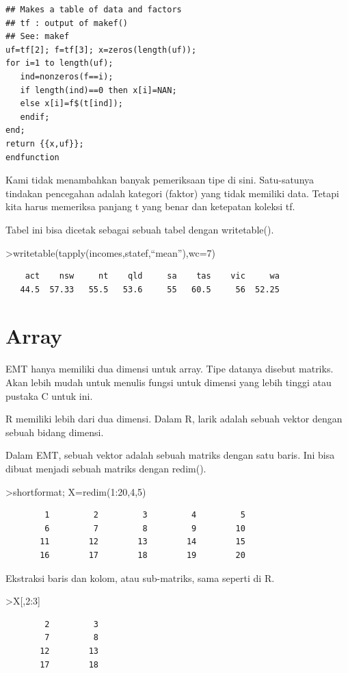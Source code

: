 \documentclass[
]{book}
\begin{document}
\begin{verbatim}
## Makes a table of data and factors
## tf : output of makef()
## See: makef
uf=tf[2]; f=tf[3]; x=zeros(length(uf));
for i=1 to length(uf);
   ind=nonzeros(f==i);
   if length(ind)==0 then x[i]=NAN;
   else x[i]=f$(t[ind]);
   endif;
end;
return {{x,uf}};
endfunction
\end{verbatim}

Kami tidak menambahkan banyak pemeriksaan tipe di sini. Satu-satunya tindakan pencegahan adalah kategori (faktor) yang tidak memiliki data. Tetapi kita harus memeriksa panjang t yang benar dan ketepatan koleksi tf.

Tabel ini bisa dicetak sebagai sebuah tabel dengan writetable().

\textgreater writetable(tapply(incomes,statef,``mean''),wc=7)

\begin{verbatim}
    act    nsw     nt    qld     sa    tas    vic     wa
   44.5  57.33   55.5   53.6     55   60.5     56  52.25
\end{verbatim}

\chapter{Array}\label{array}

EMT hanya memiliki dua dimensi untuk array. Tipe datanya disebut matriks. Akan lebih mudah untuk menulis fungsi untuk dimensi yang lebih tinggi atau pustaka C untuk ini.

R memiliki lebih dari dua dimensi. Dalam R, larik adalah sebuah vektor dengan sebuah bidang dimensi.

Dalam EMT, sebuah vektor adalah sebuah matriks dengan satu baris. Ini bisa dibuat menjadi sebuah matriks dengan redim().

\textgreater shortformat; X=redim(1:20,4,5)

\begin{verbatim}
        1         2         3         4         5 
        6         7         8         9        10 
       11        12        13        14        15 
       16        17        18        19        20 
\end{verbatim}

Ekstraksi baris dan kolom, atau sub-matriks, sama seperti di R.

\textgreater X{[},2:3{]}

\begin{verbatim}
        2         3 
        7         8 
       12        13 
       17        18 
\end{verbatim}
\end{document}
